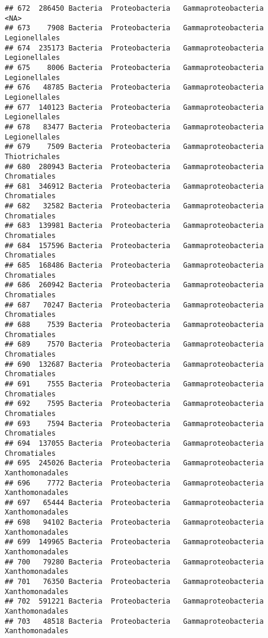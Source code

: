 \documentclass[
]{article}
\begin{document}
\begin{verbatim}
## 672  286450 Bacteria  Proteobacteria   Gammaproteobacteria                <NA>
## 673    7908 Bacteria  Proteobacteria   Gammaproteobacteria       Legionellales
## 674  235173 Bacteria  Proteobacteria   Gammaproteobacteria       Legionellales
## 675    8006 Bacteria  Proteobacteria   Gammaproteobacteria       Legionellales
## 676   48785 Bacteria  Proteobacteria   Gammaproteobacteria       Legionellales
## 677  140123 Bacteria  Proteobacteria   Gammaproteobacteria       Legionellales
## 678   83477 Bacteria  Proteobacteria   Gammaproteobacteria       Legionellales
## 679    7509 Bacteria  Proteobacteria   Gammaproteobacteria       Thiotrichales
## 680  280943 Bacteria  Proteobacteria   Gammaproteobacteria        Chromatiales
## 681  346912 Bacteria  Proteobacteria   Gammaproteobacteria        Chromatiales
## 682   32582 Bacteria  Proteobacteria   Gammaproteobacteria        Chromatiales
## 683  139981 Bacteria  Proteobacteria   Gammaproteobacteria        Chromatiales
## 684  157596 Bacteria  Proteobacteria   Gammaproteobacteria        Chromatiales
## 685  168486 Bacteria  Proteobacteria   Gammaproteobacteria        Chromatiales
## 686  260942 Bacteria  Proteobacteria   Gammaproteobacteria        Chromatiales
## 687   70247 Bacteria  Proteobacteria   Gammaproteobacteria        Chromatiales
## 688    7539 Bacteria  Proteobacteria   Gammaproteobacteria        Chromatiales
## 689    7570 Bacteria  Proteobacteria   Gammaproteobacteria        Chromatiales
## 690  132687 Bacteria  Proteobacteria   Gammaproteobacteria        Chromatiales
## 691    7555 Bacteria  Proteobacteria   Gammaproteobacteria        Chromatiales
## 692    7595 Bacteria  Proteobacteria   Gammaproteobacteria        Chromatiales
## 693    7594 Bacteria  Proteobacteria   Gammaproteobacteria        Chromatiales
## 694  137055 Bacteria  Proteobacteria   Gammaproteobacteria        Chromatiales
## 695  245026 Bacteria  Proteobacteria   Gammaproteobacteria     Xanthomonadales
## 696    7772 Bacteria  Proteobacteria   Gammaproteobacteria     Xanthomonadales
## 697   65444 Bacteria  Proteobacteria   Gammaproteobacteria     Xanthomonadales
## 698   94102 Bacteria  Proteobacteria   Gammaproteobacteria     Xanthomonadales
## 699  149965 Bacteria  Proteobacteria   Gammaproteobacteria     Xanthomonadales
## 700   79280 Bacteria  Proteobacteria   Gammaproteobacteria     Xanthomonadales
## 701   76350 Bacteria  Proteobacteria   Gammaproteobacteria     Xanthomonadales
## 702  591221 Bacteria  Proteobacteria   Gammaproteobacteria     Xanthomonadales
## 703   48518 Bacteria  Proteobacteria   Gammaproteobacteria     Xanthomonadales

\end{verbatim}
\end{document}

